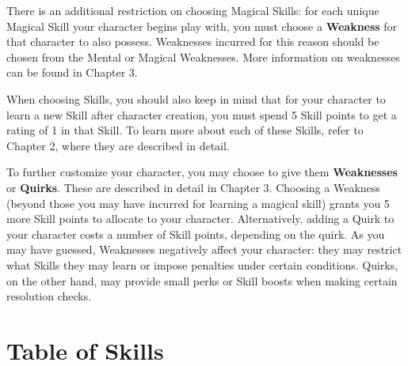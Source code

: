 \documentclass[oneside]{book}
\begin{document}
\begin{multicols}{2}
There is an additional restriction on choosing Magical Skills: for each unique Magical Skill your character begins play with, you must choose a \textbf{Weakness} for that character to also possess. Weaknesses incurred for this reason should be chosen from the Mental or Magical Weaknesses. More information on weaknesses can be found in Chapter 3.

When choosing Skills, you should also keep in mind that for your character to learn a new Skill after character creation, you must spend 5 Skill points to get a rating of 1 in that Skill. To learn more about each of these Skills, refer to Chapter 2, where they are described in detail.

To further customize your character, you may choose to give them \textbf{Weaknesses} or \textbf{Quirks}. These are described in detail in Chapter 3. Choosing a Weakness (beyond those you may have incurred for learning a magical skill) grants you 5 more Skill points to allocate to your character. Alternatively, adding a Quirk to your character costs a number of Skill points, depending on the quirk. As you may have guessed, Weaknesses negatively affect your character: they may restrict what Skills they may learn or impose penalties under certain conditions. Quirks, on the other hand, may provide small perks or Skill boosts when making certain resolution checks.
\end{multicols}

\section{Table of Skills}
\end{document}
